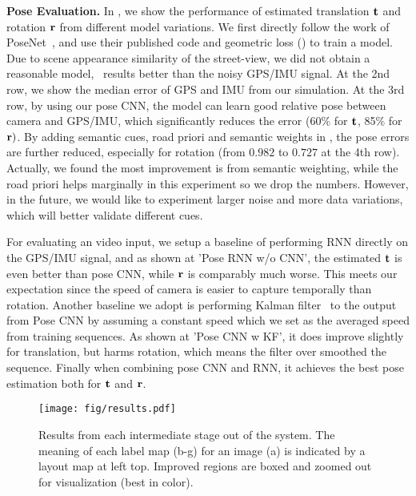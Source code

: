 \textbf{Pose Evaluation.}
In , we show the performance of estimated translation ${\mathbf t}$ and rotation ${\mathbf r}$ from different model variations. We first directly follow the work of PoseNet~\cite{Kendall_2015_ICCV,kendall2017geometric}, and use their published code and geometric loss () to train a model. 
Due to scene appearance similarity of the street-view, we did not obtain a reasonable model, \ie~results better than the noisy GPS/IMU signal.
At the 2nd row, we show the median error of GPS and IMU from our simulation. 
At the 3rd row, by using our pose CNN, the model can learn good relative pose between camera and GPS/IMU, which significantly reduces the error (60$\%$ for ${\mathbf t}$, 85$\%$ for ${\mathbf r})$. 
By adding semantic cues, \ie road priori and semantic weights in , the pose errors are further reduced, especially for rotation (from $0.982$ to $0.727$ at the 4th row). Actually, we found the most improvement is from semantic weighting, while the road priori helps marginally in this experiment so we drop the numbers. However, in the future, we would like to experiment larger noise and more data variations, which will better validate different cues.

For evaluating an video input, we setup a baseline of performing RNN directly on the GPS/IMU signal, and as shown at 'Pose RNN w/o CNN', the estimated ${\mathbf t}$ is even better than pose CNN, while ${\mathbf r}$ is comparably much worse. This meets our expectation since the speed of camera is easier to capture temporally than rotation. Another baseline we adopt is performing Kalman filter~\cite{kalman1960new} to the output from Pose CNN by assuming a constant speed which we set as the averaged speed from training sequences. As shown at 'Pose CNN w KF', it does improve slightly for translation, but harms rotation, which means the filter over smoothed the sequence. Finally when combining pose CNN and RNN, it achieves the best pose estimation both for ${\mathbf t}$ and ${\mathbf r}$.

\begin{figure*}
\center
\vspace{-0.3\baselineskip}
\texttt{[image: fig/results.pdf]}
   \caption{Results from each intermediate stage out of the system. The meaning of each label map (b-g) for an image (a) is indicated by a layout map at left top. Improved regions are boxed and zoomed out for visualization (best in color).}
\label{fig:results}
\vspace{-1.2\baselineskip}
\end{figure*}

